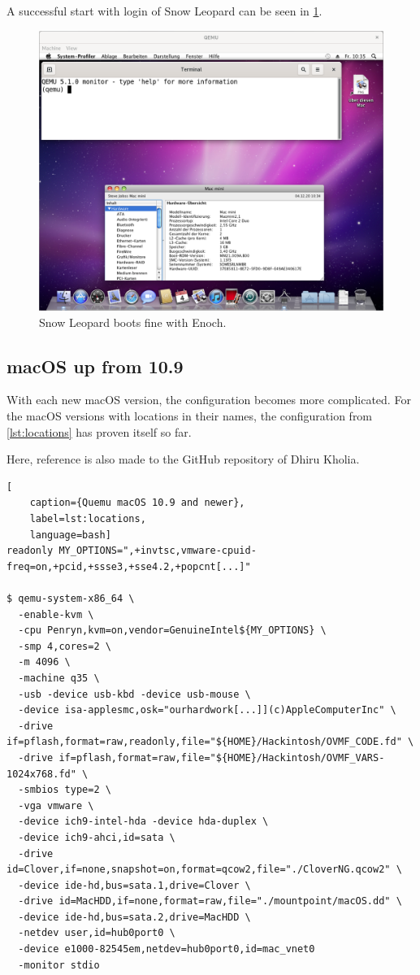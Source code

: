 \noindent A successful start with login of Snow Leopard can be seen in \cref{fig:cats}.

\begin{figure}[htbp]  %
  \centering
  \includegraphics[width=.75\textwidth]{figures/boot-macos-snow-leopard.png}
  \caption[Qemu macOS big cat]{Snow Leopard boots fine with Enoch.}
  \label{fig:cats}
\end{figure}

\subsection{macOS up from 10.9}

With each new macOS version, the configuration becomes more complicated. For the macOS versions with locations in their names, the configuration from \cref{lst:locations} has proven itself so far.

Here, reference is also made to the GitHub repository of Dhiru Kholia.

\begin{lstlisting}[
    caption={Quemu macOS 10.9 and newer},
    label=lst:locations,
    language=bash]
readonly MY_OPTIONS=",+invtsc,vmware-cpuid-freq=on,+pcid,+ssse3,+sse4.2,+popcnt[...]"

$ qemu-system-x86_64 \
  -enable-kvm \
  -cpu Penryn,kvm=on,vendor=GenuineIntel${MY_OPTIONS} \
  -smp 4,cores=2 \
  -m 4096 \
  -machine q35 \
  -usb -device usb-kbd -device usb-mouse \
  -device isa-applesmc,osk="ourhardwork[...]](c)AppleComputerInc" \
  -drive if=pflash,format=raw,readonly,file="${HOME}/Hackintosh/OVMF_CODE.fd" \
  -drive if=pflash,format=raw,file="${HOME}/Hackintosh/OVMF_VARS-1024x768.fd" \
  -smbios type=2 \
  -vga vmware \
  -device ich9-intel-hda -device hda-duplex \
  -device ich9-ahci,id=sata \
  -drive id=Clover,if=none,snapshot=on,format=qcow2,file="./CloverNG.qcow2" \
  -device ide-hd,bus=sata.1,drive=Clover \
  -drive id=MacHDD,if=none,format=raw,file="./mountpoint/macOS.dd" \
  -device ide-hd,bus=sata.2,drive=MacHDD \
  -netdev user,id=hub0port0 \
  -device e1000-82545em,netdev=hub0port0,id=mac_vnet0
  -monitor stdio
\end{lstlisting}

